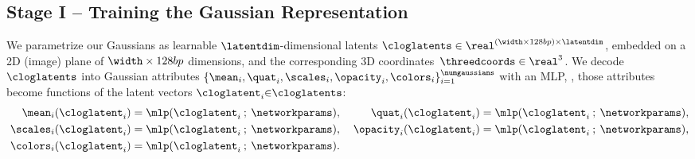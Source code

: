   \subsection{Stage I -- Training the Gaussian Representation}
    We parametrize our Gaussians as learnable $\latentdim$-dimensional latents
    $\cloglatents \in \real^{(\width \times \height)\times\latentdim}$,
    embedded on a 2D (image) plane of $\width \times \height$ dimensions, and
    the corresponding 3D coordinates~$\threedcoords \in \real^3$.
    We decode $\cloglatents$ into Gaussian attributes $\{\mean_i, \quat_i, \scales_i, \opacity_i, \colors_i \}_{i=1}^\numgaussians$ with an MLP, \ie, those attributes become functions of the latent vectors $\cloglatent_i{\in}\cloglatents$:
    \begin{equation}
      \label{eq:clog-decoders}
      \begin{aligned}
        \mean_i(\cloglatent_i)    & = \mlp(\cloglatent_i\:;\:\networkparams),
        \:
                                  &
        \quat_i(\cloglatent_i)    & =\mlp(\cloglatent_i\:;\:\networkparams),
        \\
        \:
        \scales_i(\cloglatent_i)  & =\mlp(\cloglatent_i\:;\:\networkparams),
        \:
                                  &
        \opacity_i(\cloglatent_i) & =\mlp(\cloglatent_i\:;\:\networkparams) ,
        \\
        \colors_i(\cloglatent_i)  & = \mlp(\cloglatent_i\:; \:\networkparams).
      \end{aligned}
    \end{equation}

